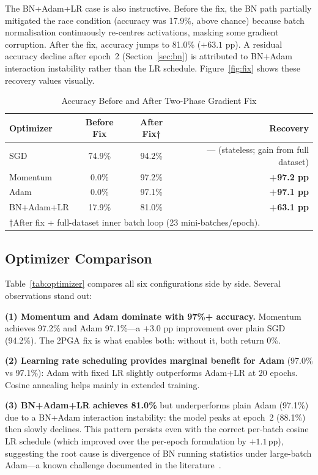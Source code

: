 \documentclass[conference]{IEEEtran}
\begin{document}
The BN+Adam+LR case is also instructive. Before the fix, the BN path partially mitigated the race condition (accuracy was 17.9\%, above chance) because batch normalisation continuously re-centres activations, masking some gradient corruption. After the fix, accuracy jumps to 81.0\% ($+63.1$ pp). A residual accuracy decline after epoch~2 (Section~\ref{sec:bn}) is attributed to BN+Adam interaction instability rather than the LR schedule. Figure~\ref{fig:fix} shows these recovery values visually.

\begin{table}[htbp]
\caption{Accuracy Before and After Two-Phase Gradient Fix}
\begin{center}
\begin{tabular}{lccr}
\toprule
\textbf{Optimizer} & \textbf{Before Fix} & \textbf{After Fix†} & \textbf{Recovery}\\
\midrule
SGD        &  74.9\% &  94.2\% & — (stateless; gain from full dataset) \\
Momentum   &   0.0\% &  97.2\% & \textbf{+97.2 pp} \\
Adam       &   0.0\% &  97.1\% & \textbf{+97.1 pp} \\
BN+Adam+LR &  17.9\% &  81.0\% & \textbf{+63.1 pp} \\
\bottomrule
\multicolumn{4}{l}{\small †After fix + full-dataset inner batch loop (23 mini-batches/epoch).}\\
\end{tabular}
\label{tab:bugfix}
\end{center}
\end{table}

\subsection{Optimizer Comparison}

Table~\ref{tab:optimizer} compares all six configurations side by side. Several observations stand out:

\textbf{(1) Momentum and Adam dominate with 97\%+ accuracy.} Momentum achieves 97.2\% and Adam 97.1\%—a $+3.0$ pp improvement over plain SGD (94.2\%). The 2PGA fix is what enables both: without it, both return 0\%.

\textbf{(2) Learning rate scheduling provides marginal benefit for Adam} (97.0\% vs 97.1\%): Adam with fixed LR slightly outperforms Adam+LR at 20 epochs. Cosine annealing helps mainly in extended training.

\textbf{(3) BN+Adam+LR achieves 81.0\%} but underperforms plain Adam (97.1\%) due to a BN+Adam interaction instability: the model peaks at epoch~2 (88.1\%) then slowly declines. This pattern persists even with the correct per-batch cosine LR schedule (which improved over the per-epoch formulation by $+1.1$\,pp), suggesting the root cause is divergence of BN running statistics under large-batch Adam—a known challenge documented in the literature~\cite{b8}.
\end{document}
